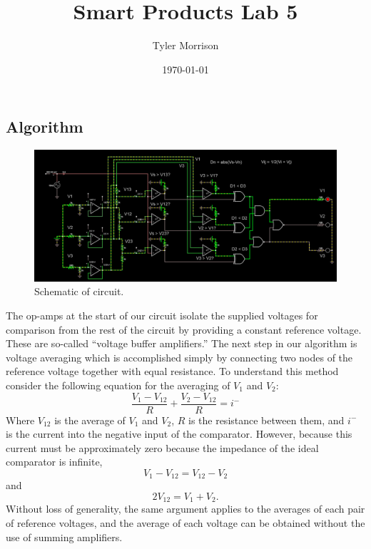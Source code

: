 \documentclass{article}
\title{Smart Products Lab 5}
\author{Tyler Morrison}
\date\today
\begin{document}
\maketitle
\section{}
\subsection{Algorithm}
\begin{figure}[H]
	\centering
	\includegraphics[keepaspectratio,width=\linewidth]{schematic.png}
	\caption{Schematic of circuit.}
\end{figure}

The op-amps at the start of our circuit isolate the supplied voltages for comparison from the rest of the circuit by providing a constant reference voltage. These are so-called ``voltage buffer amplifiers.'' The next step in our algorithm is voltage averaging which is accomplished simply by connecting two nodes of the reference voltage together with equal resistance. To understand this method consider the following equation for the averaging of $V_1$ and $V_2$: 
\begin{equation}
\frac{V_1 - V_{12}}{R} + \frac{V_2 - V_{12}}{R} = i^-
\end{equation}
Where $V_{12}$ is the average of $V_1$ and $V_2$, $R$ is the resistance between them, and $i^-$ is the current into the negative input of the comparator. However, because this current must be approximately zero because the impedance of the ideal comparator is infinite, 
\begin{equation}
V_1 - V_{12} = V_{12}- V_2
\end{equation}
and
\begin{equation}
2 V_{12} = V_1 + V_2.
\end{equation}
Without loss of generality, the same argument applies to the averages of each pair of reference voltages, and the average of each voltage can be obtained without the use of summing amplifiers.
\end{document}
